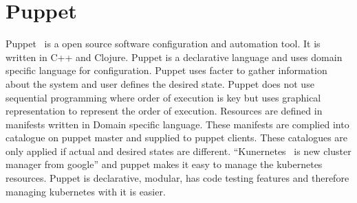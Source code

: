 \section{Puppet}

Puppet~\cite{hid-sp18-413-puppet} is a open source software configuration and
automation tool. It is written in C++ and Clojure. Puppet is a declarative
language and uses domain specific language for configuration. Puppet uses facter
to gather information about the system and user defines the desired
state. Puppet does not use sequential programming where order of execution is
key but uses graphical representation to represent the order of
execution. Resources are defined in manifests written in Domain specific
language. These manifests are complied into catalogue on puppet master and
supplied to puppet clients. These catalogues are only applied if actual and
desired states are different.  “Kunernetes~\cite{hid-sp18-413-Kubernetes} is
new cluster manager from google” and puppet makes it easy to manage the
kubernetes resources. Puppet is declarative, modular, has code testing features
and therefore managing kubernetes with it is easier.

